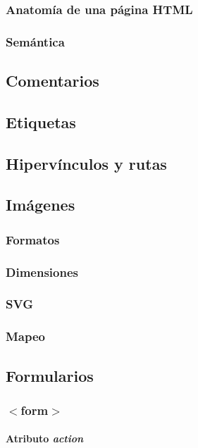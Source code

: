 \documentclass[12pt]{report}
\begin{document}
			\subsubsection{Anatomía de una página HTML}
			\subsubsection{Semántica}
		\subsection{Comentarios}
		\subsection{Etiquetas}
		\subsection{Hipervínculos y rutas}
		\subsection{Imágenes}
			\subsubsection{Formatos}
			\subsubsection{Dimensiones}
			\subsubsection{SVG}
			\subsubsection{Mapeo}
		\subsection{Formularios}
			\subsubsection{$<$form$>$}
				\paragraph{Atributo \textit{action}}
\end{document}
